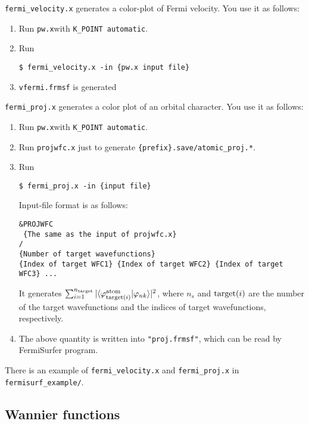 \documentclass[12pt,a4paper]{article}
\def\pwx{\texttt{pw.x}}
\begin{document}
\verb|fermi_velocity.x| generates a color-plot of Fermi velocity.
You use it as follows:
\begin{enumerate}
\item Run \pwx with \verb|K_POINT automatic|.
\item Run 
\begin{verbatim}
$ fermi_velocity.x -in {pw.x input file}
\end{verbatim}  
\item \verb|vfermi.frmsf| is generated
\end{enumerate}

\verb|fermi_proj.x| generates a color plot of an orbital character.
You use it as follows:
\begin{enumerate}
\item Run \pwx with \verb|K_POINT automatic|.
\item Run \verb|projwfc.x| just to generate \verb|{prefix}.save/atomic_proj.*|.
\item Run 
\begin{verbatim}
$ fermi_proj.x -in {input file}
\end{verbatim}
Input-file format is as follows:
\begin{verbatim}
&PROJWFC
 {The same as the input of projwfc.x}
/
{Number of target wavefunctions}
{Index of target WFC1} {Index of target WFC2} {Index of target WFC3} ...
\end{verbatim}
It generates 
$\sum_{i=1}^{n_{\rm target}} |\langle \varphi_{{\rm target}(i)}^{\rm atom}|\varphi_{n k} \rangle|^2$, 
where $n_s$ and ${\rm target}(i)$ are
the number of the target wavefunctions
and the indices of target wavefunctions, respectively.
\item The above quantity is written into \verb|"proj.frmsf"|,
  which can be read by FermiSurfer program.
\end{enumerate}

There is an example of \verb|fermi_velocity.x| and \verb|fermi_proj.x|
in \verb|fermisurf_example/|.

\subsection{Wannier functions}
\end{document}
